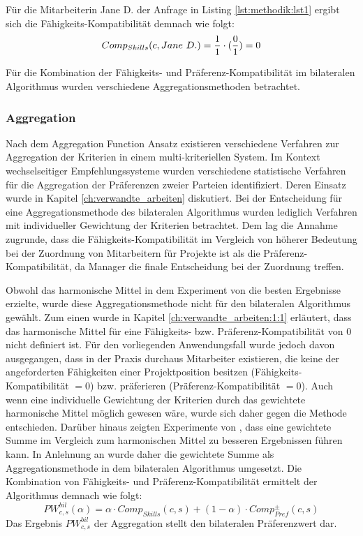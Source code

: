 Für die Mitarbeiterin Jane D. der Anfrage in Listing \ref{lst:methodik:lst1} ergibt sich die Fähigkeits-Kompatibilität demnach wie folgt:
\begin{equation}\label{methodik:eq:5}
    Comp_{Skills}(c,Jane \textnormal{ }D.) = \frac{1}{1} \cdot (\frac{0}{1}) = 0
\end{equation}

Für die Kombination der Fähigkeits- und Präferenz-Kompatibilität im bilateralen Algorithmus wurden verschiedene Aggregationsmethoden betrachtet.

\subsubsection{Aggregation}
Nach dem Aggregation Function Ansatz existieren verschiedene Verfahren zur Aggregation der Kriterien in einem multi-kriteriellen System.
Im Kontext wechselseitiger Empfehlungssysteme wurden verschiedene statistische Verfahren für die Aggregation der Präferenzen zweier Parteien identifiziert.
Deren Einsatz wurde in Kapitel \ref{ch:verwandte_arbeiten} diskutiert.
Bei der Entscheidung für eine Aggregationsmethode des bilateralen Algorithmus wurden lediglich Verfahren mit individueller Gewichtung der Kriterien betrachtet.
Dem lag die Annahme zugrunde, dass die Fähigkeits-Kompatibilität im Vergleich von höherer Bedeutung bei der Zuordnung von Mitarbeitern für Projekte ist als die Präferenz-Kompatibilität, da Manager die finale Entscheidung bei der Zuordnung treffen.

Obwohl das harmonische Mittel in dem Experiment von \textcite[S. 1ff.]{kumari:2:inproceedings} die besten Ergebnisse erzielte, wurde diese Aggregationsmethode nicht für den bilateralen Algorithmus gewählt.
Zum einen wurde in Kapitel \ref{ch:verwandte_arbeiten:1:1} erläutert, dass das harmonische Mittel für eine Fähigkeits- bzw. Präferenz-Kompatibilität von 0 nicht definiert ist.
Für den vorliegenden Anwendungsfall wurde jedoch davon ausgegangen, dass in der Praxis durchaus Mitarbeiter existieren, die keine der angeforderten Fähigkeiten einer Projektposition besitzen (Fähigkeits-Kompatibilität $= 0$) bzw. präferieren (Präferenz-Kompatibilität $= 0$).
Auch wenn eine individuelle Gewichtung der Kriterien durch das gewichtete harmonische Mittel möglich gewesen wäre, wurde sich daher gegen die Methode entschieden.
Darüber hinaus zeigten Experimente von \textcite[S. 131ff.]{kleinerman:2:inproceedings}, dass eine gewichtete Summe im Vergleich zum harmonischen Mittel zu besseren Ergebnissen führen kann.
In Anlehnung an \textcite[S. 131ff.]{kleinerman:2:inproceedings} wurde daher die gewichtete Summe als Aggregationsmethode in dem bilateralen Algorithmus umgesetzt.
Die Kombination von Fähigkeits- und Präferenz-Kompatibilität ermittelt der Algorithmus demnach wie folgt:
\begin{equation}\label{methodik:eq:6}
    PW_{c,s}^{bil}(\alpha) = \alpha \cdot Comp_{Skills}(c,s) + (1-\alpha) \cdot Comp_{Pref}^{\pm}(c,s)
\end{equation}
Das Ergebnis $PW_{c,s}^{bil}$ der Aggregation stellt den bilateralen Präferenzwert dar.

